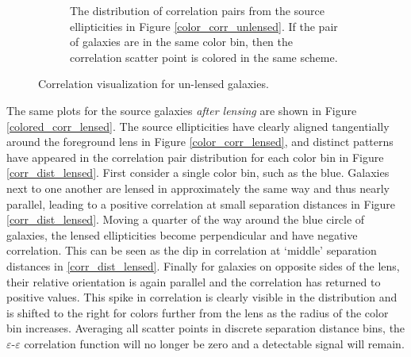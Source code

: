\documentclass[%
 reprint,
 amsmath,amssymb,
 aps,nofootinbib
]{revtex4-1}
\begin{document}
\begin{figure}
\begin{subfigure}{0.45\textwidth}
        \captionsetup{justification=raggedright,singlelinecheck=false}
        \caption{The distribution of correlation pairs from the source ellipticities in Figure \ref{color_corr_unlensed}. If the pair of galaxies are in the same color bin, then the correlation scatter point is colored in the same scheme.}
        \label{corr_dist_unlensed}
    \end{subfigure}
    \caption{Correlation visualization for un-lensed galaxies.}
    \label{colored_corr}
\end{figure}

The same plots for the source galaxies \textit{after lensing} are shown in Figure \ref{colored_corr_lensed}. The source ellipticities have clearly aligned tangentially around the foreground lens in Figure \ref{color_corr_lensed}, and distinct patterns have appeared in the correlation pair distribution for each color bin in Figure \ref{corr_dist_lensed}. First consider a single color bin, such as the blue. Galaxies next to one another are lensed in approximately the same way and thus nearly parallel, leading to a positive correlation at small separation distances in Figure \ref{corr_dist_lensed}. Moving a quarter of the way around the blue circle of galaxies, the lensed ellipticities become perpendicular and have negative correlation. This can be seen as the dip in correlation at `middle' separation distances in \ref{corr_dist_lensed}. Finally for galaxies on opposite sides of the lens, their relative orientation is again parallel and the correlation has returned to positive values. This spike in correlation is clearly visible in the distribution and is shifted to the right for colors further from the lens as the radius of the color bin increases. Averaging all scatter points in discrete separation distance bins, the $\varepsilon$-$\varepsilon$ correlation function will no longer be zero and a detectable signal will remain.
\end{document}
